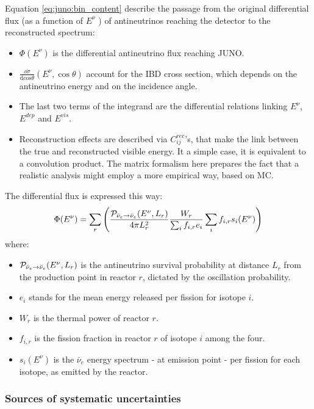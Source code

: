 \documentclass[../main.tex]{subfiles}
\begin{document}
Equation \ref{eq:juno:bin_content} describe the passage from the original differential flux (as a function of $E^{\nu}$ ) of antineutrinos reaching the detector to the reconstructed spectrum:
\begin{itemize}
  \item $\Phi(E^{\nu})$ is the differential antineutrino flux reaching JUNO.
  \item $\frac{\dd\sigma}{\mathrm{dcos}\theta}(E^{\nu}, \cos\theta)$ account for the IBD cross section, which depends on the antineutrino energy and on the incidence angle.
  \item The last two terms of the integrand are the differential relations linking $E^{\nu}$, $E^{dep}$ and $E^{vis}$.
  \item Reconstruction effects are described via $C^{rec}_{ij}$'s, that make the link between the true and reconstructed visible energy. It a simple case, it is equivalent to a convolution product. The matrix formalism here prepares the fact that a realistic analysis might employ a more empirical way, based on MC.
\end{itemize}
\hfill

The differential flux is expressed this way:
\begin{equation}
\Phi(E^{\nu}) = \sum_{r} \left( \frac{{\cal P}_{\bar{\nu}_e\rightarrow \bar{\nu}_e}(E^{\nu},L_r)}{4\pi L^2_r} \frac{W_r}{\sum_{i} f_{i,r} e_i} \sum_{i} f_{i,r} s_i(E^{\nu}) \right)
\end{equation}
where:
\begin{itemize}
  \item ${\cal P}_{\bar{\nu}_e\rightarrow \bar{\nu}_e}(E^{\nu},L_r)$ is the antineutrino survival probability at distance $L_r$ from the production point in reactor $r$, dictated by the oscillation probability.
  \item $e_i$ stands for the mean energy released per fission for isotope $i$.
  \item $W_r$ is the thermal power of reactor $r$.
  \item $f_{i,r}$ is the fission fraction in reactor $r$ of isotope $i$ among the four.
  \item $s_i(E^{\nu})$ is the $\bar{\nu}_e$ energy spectrum - at emission point -  per fission for each isotope, as emitted by the reactor.
\end{itemize}
\hfill

\subsubsection{Sources of systematic uncertainties}
\end{document}
